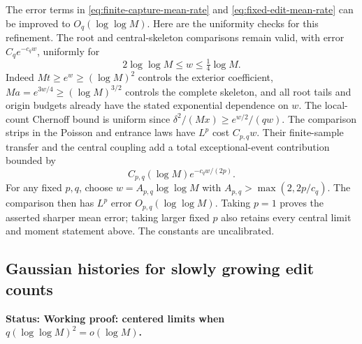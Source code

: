 \documentclass[11pt,letterpaper]{article}
\newcommand{\status}[1]{\textbf{Status: #1.}}
\begin{document}
\begin{remark}
\label{rem:history-mean-loglog}
The error terms in \eqref{eq:finite-capture-mean-rate} and
\eqref{eq:fixed-edit-mean-rate} can be improved to $O_q(\log\log M)$.
Here are the uniformity checks for this refinement. The root and
central-skeleton comparisons remain valid, with error
$C_qe^{-c_qw}$, uniformly for
\[
 2\log\log M\le w\le\tfrac14\log M.
\]
Indeed $Mt\ge e^w\ge(\log M)^2$ controls the exterior coefficient,
$Ma=e^{3w/4}\ge(\log M)^{3/2}$ controls the complete skeleton,
and all root tails and origin budgets already have the stated
exponential dependence on $w$. The local-count Chernoff bound
is uniform since $\delta^2/(Mx)\ge e^{w/2}/(q w)$.
The comparison strips in the Poisson and entrance laws have $L^p$
cost $C_{p,q}w$. Their finite-sample transfer and the central
coupling add a total exceptional-event contribution bounded by
\[
 C_{p,q}(\log M)e^{-c_qw/(2p)}.
\]
For any fixed $p,q$, choose $w=A_{p,q}\log\log M$ with
$A_{p,q}>\max(2,2p/c_q)$. The comparison then has $L^p$ error
$O_{p,q}(\log\log M)$. Taking $p=1$ proves the asserted sharper
mean error; taking larger fixed $p$ also retains every central
limit and moment statement above. The constants are uncalibrated.
\end{remark}

\subsection{Gaussian histories for slowly growing edit counts}
\label{sec:slow-history-CLT}

\status{Working proof: centered limits when $q(\log\log M)^2=o(\log M)$}
\end{document}

